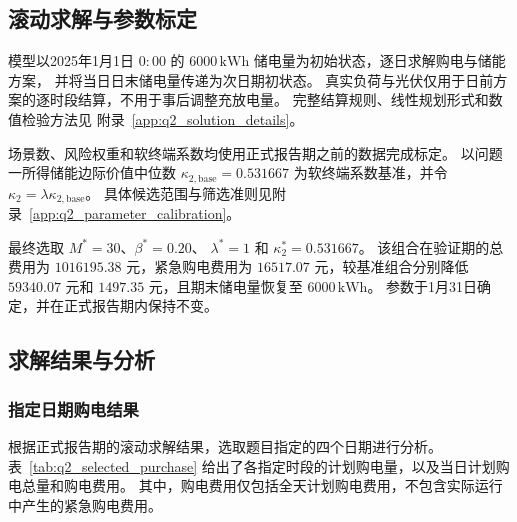 \subsection{滚动求解与参数标定}

模型以2025年1月1日 $0{:}00$ 的
$6000\,\mathrm{kWh}$ 储电量为初始状态，逐日求解购电与储能方案，
并将当日日末储电量传递为次日期初状态。
真实负荷与光伏仅用于日前方案的逐时段结算，不用于事后调整充放电量。
完整结算规则、线性规划形式和数值检验方法见
附录~\ref{app:q2_solution_details}。

场景数、风险权重和软终端系数均使用正式报告期之前的数据完成标定。
以问题一所得储能边际价值中位数
$\kappa_{2,\mathrm{base}}=0.531667$
为软终端系数基准，并令
$\kappa_2=\lambda\kappa_{2,\mathrm{base}}$。
具体候选范围与筛选准则见附录~\ref{app:q2_parameter_calibration}。

最终选取
$M^\ast=30$、$\beta^\ast=0.20$、
$\lambda^\ast=1$ 和 $\kappa_2^\ast=0.531667$。
该组合在验证期的总费用为 $1016195.38$ 元，紧急购电费用为
$16517.07$ 元，较基准组合分别降低 $59340.07$ 元和
$1497.35$ 元，且期末储电量恢复至
$6000\,\mathrm{kWh}$。
参数于1月31日确定，并在正式报告期内保持不变。

\subsection{求解结果与分析}

\subsubsection{指定日期购电结果}

根据正式报告期的滚动求解结果，选取题目指定的四个日期进行分析。
表~\ref{tab:q2_selected_purchase} 给出了各指定时段的计划购电量，以及当日计划购电总量和购电费用。
其中，购电费用仅包括全天计划购电费用，不包含实际运行中产生的紧急购电费用。


